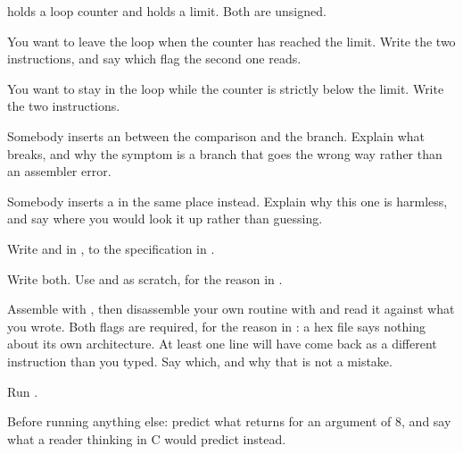 \label{c1:ex:branch}
 holds a loop counter and  holds a limit. Both are unsigned.
\begin{parts}
  \item You want to leave the loop when the counter has reached the limit. Write the two
    instructions, and say which flag the second one reads.
  \item You want to stay in the loop while the counter is strictly below the limit. Write the two
    instructions.
  \item Somebody inserts an  between the comparison and the branch. Explain what
    breaks, and why the symptom is a branch that goes the wrong way rather than an assembler
    error.
  \item Somebody inserts a  in the same place instead. Explain why this one is
    harmless, and say where you would look it up rather than guessing.
\end{parts}

\label{c1:ex:firstsub}
Write  and  in , to the
specification in .
\begin{parts}
  \item Write both. Use  and  as scratch, for the reason in
    .
  \item Assemble with , then disassemble your own routine with
     and read it against what you
    wrote. Both flags are required, for the reason in : a hex file says nothing
    about its own architecture. At least one line will have come back as a different instruction
    than you typed. Say which, and why that is not a mistake.
  \item Run .
  \item Before running anything else: predict what  returns for an argument of 8,
    and say what a reader thinking in C would predict instead.
\end{parts}

